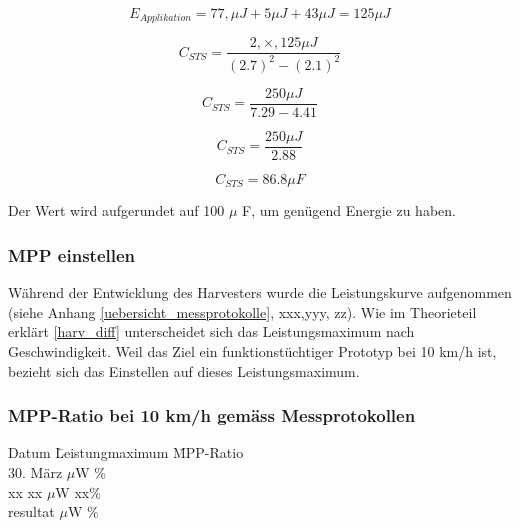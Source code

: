 \begin{equation}
  E_{Applikation} = 77, \mu J + 5 \mu J + 43 \mu J = 125 \mu J
\end{equation}


\begin{equation}
  C_{STS}= \frac{2,\times, 125 \mu J}{(2.7)^2 - (2.1)^2}
\end{equation}

\begin{equation}
  C_{STS}= \frac{ 250 \mu J}{7.29 - 4.41}
\end{equation}

\begin{equation}
  C_{STS}= \frac{ 250 \mu J}{2.88}
\end{equation}

\begin{equation}
  C_{STS}= 86.8 \mu F
\end{equation}

Der Wert wird aufgerundet auf 100 $\mu$ F, um genügend Energie zu haben.

\subsubsection{MPP einstellen}


Während der Entwicklung des Harvesters wurde die Leistungskurve aufgenommen (siehe Anhang \ref{uebersicht_messprotokolle}, xxx,yyy, zz). Wie im Theorieteil erklärt \ref{harv_diff} unterscheidet sich das Leistungsmaximum nach Geschwindigkeit. Weil das Ziel ein funktionstüchtiger Prototyp bei 10 km/h ist, bezieht sich das Einstellen auf dieses Leistungsmaximum.  

 
\subsubsection*{MPP-Ratio bei 10 km/h gemäss Messprotokollen}
\begin{tabbing}
    Datum       \quad\= Leistungmaximum    \quad\= MPP-Ratio\\[0.8ex]
    30. März     $\mu$W        \thinspace\% \\
    xx          \> xx $\mu$W        \> xx\thinspace\%\\
    resultat      $\mu$W    \thinspace\%\\
\end{tabbing}


